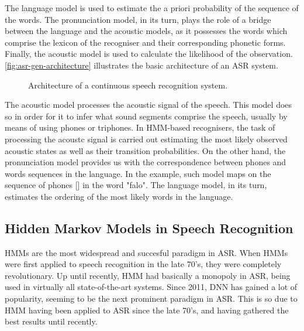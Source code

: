The language model is used to estimate the a priori probability of the sequence of the words. The pronunciation model, in its turn, plays the role of a bridge between the language and the acoustic models, as it possesses the words which comprise the lexicon of the recogniser and their corresponding phonetic forms. Finally, the acoustic model is used to calculate the likelihood of the observation. \autoref{fig:asr-gen-architecture} illustrates the basic architecture of an ASR system.

\begin{figure}[!ht]
        \noindent{}
        \caption{Architecture of a continuous speech recognition system.}
        \label{fig:asr-gen-architecture}
\end{figure}

The acoustic model processes the acoustic signal of the speech. This model does so in order for it to infer what sound segments comprise the speech, usually by means of using phones or triphones. In HMM-based recognisers, the task of processing the acoustc signal is carried out  estimating the most likely observed acoustic states as well as their transition probabilities. On the other hand, the pronunciation model provides us with the correspondence between phones and words sequences in the language. In the example, such model maps on the sequence of phones [] in the word "falo". The language model, in its turn, estimates the ordering of the most likely words in the language. 

\subsection{Hidden Markov Models in Speech Recognition}

\ac{HMM}s are the most widespread and succesful paradigm in \ac{ASR}. When \ac{HMM}s were first applied
to speech recognition in the late 70's, they were completely revolutionary.
Up until recently, \ac{HMM} had basically a monopoly in \ac{ASR}, being used in virtually all state-of-the-art systems. Since 2011, \ac{DNN} \cite{Povey2011} has gained a lot of popularity, seeming to be the next prominent paradigm in \ac{ASR}.
This is so due to \ac{HMM} having been applied
to \ac{ASR} since the late 70's, and having gathered the best results until recently.

